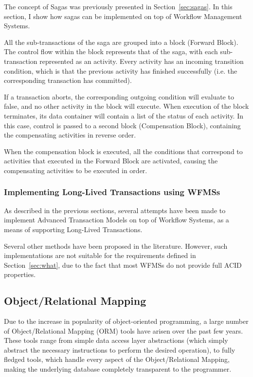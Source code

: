 \documentclass{llncs}
\begin{document}
The concept of Sagas was previously presented in
Section~\ref{sec:sagas}. In this section, I show how sagas can be
implemented on top of Workflow Management Systems.

All the sub-transactions of the saga are grouped into a block (Forward
Block). The control flow within the block represents that of the saga,
with each sub-transaction represented as an activity. Every activity
has an incoming transition condition, which is that the previous
activity has finished successfully (i.e. the corresponding transaction
has committed).

If a transaction aborts, the corresponding outgoing condition will
evaluate to false, and no other activity in the block will
execute. When execution of the block terminates, its data container
will contain a list of the status of each activity. In this case,
control is passed to a second block (Compensation Block), containing
the compensating activities in reverse order.

When the compensation block is executed, all the conditions that
correspond to activities that executed in the Forward Block are
activated, causing the compensating activities to be executed in
order.

\subsubsection{Implementing Long-Lived Transactions using WFMSs}

As described in the previous sections, several attempts have been made
to implement Advanced Transaction Models on top of Workflow Systems,
as a means of supporting Long-Lived Transactions.

Several other methods have been proposed in the
literature\cite{798492, alonso1996advanced}. However, such
implementations are not suitable for the requirements defined in
Section~\ref{sec:what}, due to the fact that most WFMSs do not provide
full ACID properties.

\subsection{Object/Relational Mapping}
\label{sec:orm}

Due to the increase in popularity of object-oriented programming, a
large number of Object/Relational Mapping (ORM) tools have arisen over
the past few years\cite{orm}. These tools range from simple data
access layer abstractions (which simply abstract the necessary
instructions to perform the desired operation), to fully fledged
tools, which handle every aspect of the Object/Relational Mapping,
making the underlying database completely transparent to the
programmer.
\end{document}
